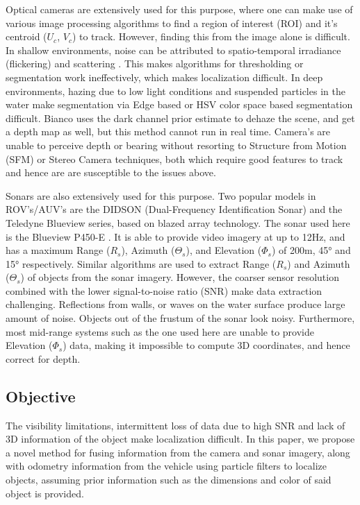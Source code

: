 \documentclass[15pt]{article}
\let\Theta\varTheta
\let\Phi\varPhi
\newcommand{\RSonar}{$\si{\textit{R}_{s}}$\xspace}
\newcommand{\ThetaSonar}{$\si{\Theta_{s}}$\xspace}
\newcommand{\PhiSonar}{$\si{\Phi_{s}}$\xspace}
\newcommand{\UCamera}{$\si{\textit{U}_{c}}$\xspace}
\newcommand{\VCamera}{$\si{\textit{V}_{c}}$\xspace}
\begin{document}
Optical cameras are extensively used for this purpose, where one can make use of various image processing algorithms to find a region of interest (ROI) and it's centroid (\UCamera, \VCamera) to track. However, finding this from the image alone is difficult. In shallow environments, noise can be attributed to spatio-temporal irradiance (flickering) and scattering \cite{Swirski2013}. This makes algorithms for thresholding or segmentation work ineffectively, which makes localization difficult. In deep environments, hazing due to low light conditions and suspended particles in the water make segmentation via Edge based or HSV color space based segmentation difficult. Bianco \cite{Carlevaris-Bianco2010} uses the dark channel prior estimate to dehaze the scene, and get a depth map as well, but this method cannot run in real time. Camera's are unable to perceive depth or bearing without resorting to Structure from Motion (SFM) or Stereo Camera techniques, both which require good features to track and hence are are susceptible to the issues above.

Sonars are also extensively used for this purpose. Two popular models in ROV's/AUV's are the DIDSON (Dual-Frequency Identification Sonar) and the Teledyne Blueview series, based on blazed array technology. The sonar used here is the Blueview P450-E \cite{Blueview}. It is able to provide video imagery at up to 12Hz, and has a maximum Range (\RSonar), Azimuth (\ThetaSonar), and Elevation (\PhiSonar) of 200m, 45\si{\degree} and 15\si{\degree} respectively.  Similar algorithms are used to extract Range (\RSonar) and Azimuth (\ThetaSonar) of objects from the sonar imagery.  However, the coarser sensor resolution combined with the lower signal-to-noise ratio (SNR) make data extraction challenging. Reflections from walls, or waves on the water surface produce large amount of noise. Objects out of the frustum of the sonar look noisy. Furthermore, most mid-range systems such as the one used here are unable to provide Elevation (\PhiSonar) data, making it impossible to compute 3D coordinates, and hence correct for depth.

\subsection{Objective}

The visibility limitations, intermittent loss of data due to high SNR and lack of 3D information of the object make localization difficult. In this paper, we propose a novel method for fusing information from the camera and sonar imagery, along with odometry information from the vehicle using particle filters to localize objects, assuming prior information such as the dimensions and color of said object is provided.
\end{document}
